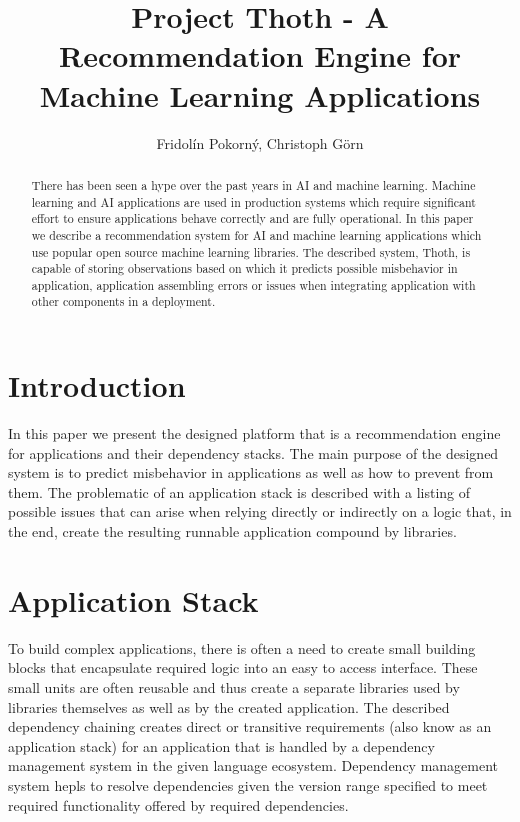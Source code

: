 \documentclass[a4paper]{llncs}
\begin{document}
%
\title{Project Thoth - A Recommendation Engine for Machine Learning Applications}
%
%
\author{Fridol\'in Pokorn\'y, Christoph G\"orn}


\maketitle
\begin{abstract}
There has been seen a hype over the past years in AI and machine learning. Machine learning and AI applications are used in production systems which require significant effort to ensure applications behave correctly and are fully operational. In this paper we describe a recommendation system for AI and machine learning applications which use popular open source machine learning libraries. The described system, Thoth, is capable of storing observations based on which it predicts possible misbehavior in application, application assembling errors or issues when integrating application with other components in a deployment.
\end{abstract}

\section{Introduction}

In this paper we present the designed platform that is a recommendation engine for applications and their dependency stacks. The main purpose of the designed system is to predict misbehavior in applications as well as how to prevent from them. The problematic of an application stack is described with a listing of possible issues that can arise when relying directly or indirectly on a logic that, in the end, create the resulting runnable application compound by libraries.

\section{Application Stack}

To build complex applications, there is often a need to create small building blocks that encapsulate required logic into an easy to access interface. These small units are often reusable and thus create a separate libraries used by libraries themselves as well as by the created application. The described dependency chaining creates direct or transitive requirements (also know as an application stack) for an application that is handled by a dependency management system in the given language ecosystem. Dependency management system hepls to resolve dependencies given the version range specified to meet required functionality offered by required dependencies.
\end{document}
